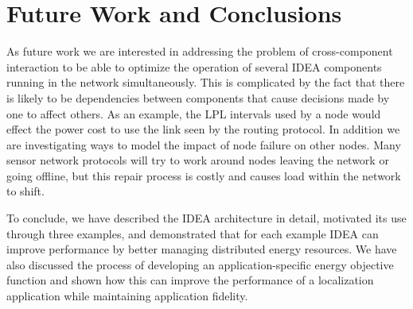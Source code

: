 \section{Future Work and Conclusions}
\label{idea-sec-futurework}

As future work we are interested in addressing the problem of cross-component
interaction to be able to optimize the operation of several IDEA components
running in the network simultaneously. This is complicated by the fact that
there is likely to be dependencies between components that cause decisions
made by one to affect others. As an example, the LPL intervals used by a node
would effect the power cost to use the link seen by the routing protocol.  In
addition we are investigating ways to model the impact of node failure on
other nodes. Many sensor network protocols will try to work around nodes
leaving the network or going offline, but this repair process is costly and
causes load within the network to shift.

To conclude, we have described the IDEA architecture in detail, motivated its
use through three examples, and demonstrated that for each example IDEA can
improve performance by better managing distributed energy resources. We have
also discussed the process of developing an application-specific energy
objective function and shown how this can improve the performance of a
localization application while maintaining application fidelity.
\vfill\eject
